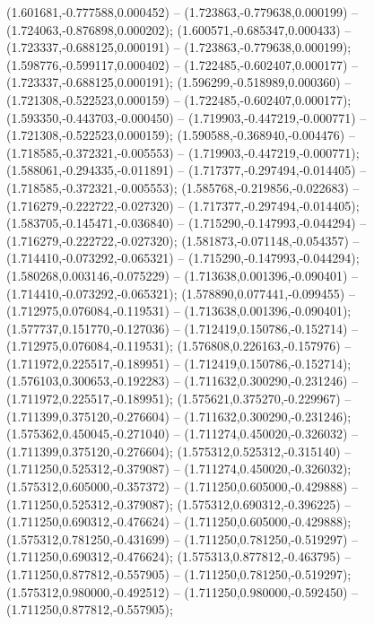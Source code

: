  (1.601681,-0.777588,0.000452) -- (1.723863,-0.779638,0.000199) -- (1.724063,-0.876898,0.000202);
 (1.600571,-0.685347,0.000433) -- (1.723337,-0.688125,0.000191) -- (1.723863,-0.779638,0.000199);
 (1.598776,-0.599117,0.000402) -- (1.722485,-0.602407,0.000177) -- (1.723337,-0.688125,0.000191);
 (1.596299,-0.518989,0.000360) -- (1.721308,-0.522523,0.000159) -- (1.722485,-0.602407,0.000177);
 (1.593350,-0.443703,-0.000450) -- (1.719903,-0.447219,-0.000771) -- (1.721308,-0.522523,0.000159);
 (1.590588,-0.368940,-0.004476) -- (1.718585,-0.372321,-0.005553) -- (1.719903,-0.447219,-0.000771);
 (1.588061,-0.294335,-0.011891) -- (1.717377,-0.297494,-0.014405) -- (1.718585,-0.372321,-0.005553);
 (1.585768,-0.219856,-0.022683) -- (1.716279,-0.222722,-0.027320) -- (1.717377,-0.297494,-0.014405);
 (1.583705,-0.145471,-0.036840) -- (1.715290,-0.147993,-0.044294) -- (1.716279,-0.222722,-0.027320);
 (1.581873,-0.071148,-0.054357) -- (1.714410,-0.073292,-0.065321) -- (1.715290,-0.147993,-0.044294);
 (1.580268,0.003146,-0.075229) -- (1.713638,0.001396,-0.090401) -- (1.714410,-0.073292,-0.065321);
 (1.578890,0.077441,-0.099455) -- (1.712975,0.076084,-0.119531) -- (1.713638,0.001396,-0.090401);
 (1.577737,0.151770,-0.127036) -- (1.712419,0.150786,-0.152714) -- (1.712975,0.076084,-0.119531);
 (1.576808,0.226163,-0.157976) -- (1.711972,0.225517,-0.189951) -- (1.712419,0.150786,-0.152714);
 (1.576103,0.300653,-0.192283) -- (1.711632,0.300290,-0.231246) -- (1.711972,0.225517,-0.189951);
 (1.575621,0.375270,-0.229967) -- (1.711399,0.375120,-0.276604) -- (1.711632,0.300290,-0.231246);
 (1.575362,0.450045,-0.271040) -- (1.711274,0.450020,-0.326032) -- (1.711399,0.375120,-0.276604);
 (1.575312,0.525312,-0.315140) -- (1.711250,0.525312,-0.379087) -- (1.711274,0.450020,-0.326032);
 (1.575312,0.605000,-0.357372) -- (1.711250,0.605000,-0.429888) -- (1.711250,0.525312,-0.379087);
 (1.575312,0.690312,-0.396225) -- (1.711250,0.690312,-0.476624) -- (1.711250,0.605000,-0.429888);
 (1.575312,0.781250,-0.431699) -- (1.711250,0.781250,-0.519297) -- (1.711250,0.690312,-0.476624);
 (1.575313,0.877812,-0.463795) -- (1.711250,0.877812,-0.557905) -- (1.711250,0.781250,-0.519297);
 (1.575312,0.980000,-0.492512) -- (1.711250,0.980000,-0.592450) -- (1.711250,0.877812,-0.557905);
